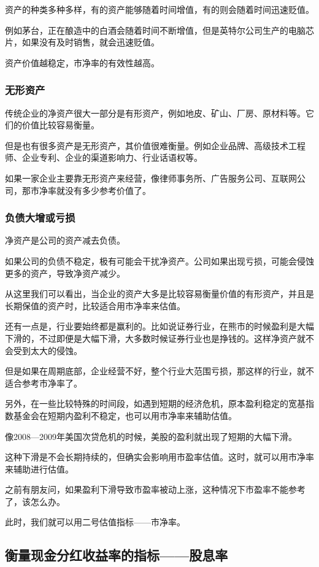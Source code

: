 资产的种类多种多样，有的资产能够随着时间增值，有的则会随着时间迅速贬值。

例如茅台，正在酿造中的白酒会随着时间不断增值，但是英特尔公司生产的电脑芯片，如果没有及时销售，就会迅速贬值。

资产价值越稳定，市净率的有效性越高。

\subsubsection{无形资产}

传统企业的净资产很大一部分是有形资产，例如地皮、矿山、厂房、原材料等。它们的价值比较容易衡量。

但是也有很多资产是无形资产，其价值很难衡量。例如企业品牌、高级技术工程师、企业专利、企业的渠道影响力、行业话语权等。

如果一家企业主要靠无形资产来经营，像律师事务所、广告服务公司、互联网公司，那市净率就没有多少参考价值了。

\subsubsection{负债大增或亏损}

净资产是公司的资产减去负债。

如果公司的负债不稳定，极有可能会干扰净资产。公司如果出现亏损，可能会侵蚀更多的资产，导致净资产减少。

从这里我们可以看出，当企业的资产大多是比较容易衡量价值的有形资产，并且是长期保值的资产时，比较适合用市净率来估值。

还有一点是，行业要始终都是赢利的。比如说证券行业，在熊市的时候盈利是大幅下滑的，不过即便是大幅下滑，大多数时候证券行业也是挣钱的。这样净资产就不会受到太大的侵蚀。

但是如果在周期底部，企业经营不好，整个行业大范围亏损，那这样的行业，就不适合参考市净率了。

另外，在一些比较特殊的时间段，如遇到短期的经济危机，原本盈利稳定的宽基指数基金会在短期内盈利不稳定，也可以用市净率来辅助估值。

像2008—2009年美国次贷危机的时候，美股的盈利就出现了短期的大幅下滑。

这种下滑是不会长期持续的，但确实会影响用市盈率估值。这时，就可以用市净率来辅助进行估值。

之前有朋友问，如果盈利下滑导致市盈率被动上涨，这种情况下市盈率不能参考了，该怎么办。

此时，我们就可以用二号估值指标——市净率。

\subsection{衡量现金分红收益率的指标——股息率}
